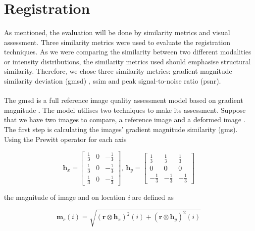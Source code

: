 \documentclass[12pt,oneside]{report}
\begin{document}
\section{Registration}

\paragraph{}
As mentioned, the evaluation will be done by similarity metrics and visual assessment. Three similarity metrics were used to evaluate the registration techniques. As we were comparing the similarity between two different modalities or intensity distributions, the similarity metrics used should emphasise structural similarity. Therefore, we chose three similarity metrics: gradient magnitude similarity deviation (\acrshort{gmsd}) \cite{xue_gradient_2014}, \acrshort{ssim} and peak signal-to-noise ratio (\acrshort{psnr}).

\paragraph{}
The \acrshort{gmsd} is a full reference image quality assessment model based on gradient magnitude \cite{xue_gradient_2014}. The model utilises two techniques to make its assessment. Suppose that we have two images to compare, a reference image  and a deformed image . The first step is calculating the images' gradient magnitude similarity (\acrshort{gms}). Using the Prewitt operator for each axis

\begin{equation}
    \textbf{h}_x = 
    \begin{bmatrix}
        \frac{1}{3} & 0 & -\frac{1}{3} \\
        \frac{1}{3} & 0 & -\frac{1}{3} \\
        \frac{1}{3} & 0 & -\frac{1}{3}
    \end{bmatrix}, \:
    \textbf{h}_y = 
    \begin{bmatrix}
        \frac{1}{3} & \frac{1}{3} & \frac{1}{3} \\
        0 & 0 & 0 \\
        -\frac{1}{3} & -\frac{1}{3} & -\frac{1}{3}
    \end{bmatrix}
\end{equation}

the magnitude of image  and  on location \textit{i} are defined as

\begin{equation}
    \textbf{m}_{r}(i) = 
    \sqrt{
        {(\textbf{r} \otimes \textbf{h}_x)}^2 (i)
        +
        {(\textbf{r} \otimes \textbf{h}_y)}^2 (i)
    }
\end{equation}
\end{document}
